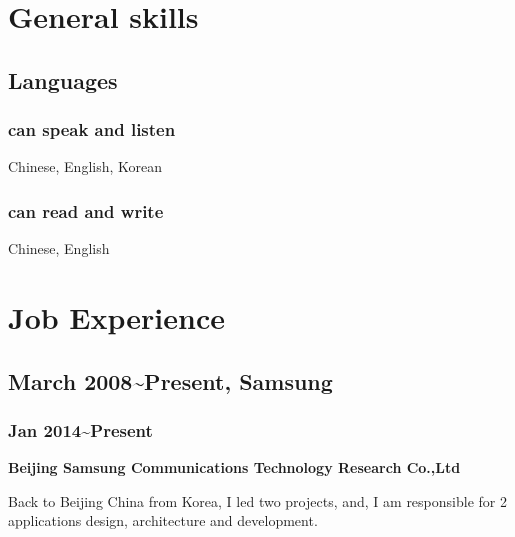 \documentclass{article}
\begin{document}
\section{General skills}
\subsection{Languages}

\subsubsection{can speak and listen}
Chinese, English, Korean

\subsubsection{can read and write}
Chinese, English

\section{Job Experience}
\subsection{March 2008\~{}Present, Samsung}

\subsubsection{Jan 2014\~{}Present}
\textbf{Beijing Samsung Communications Technology Research Co.,Ltd}

Back to Beijing China from Korea, I led two projects, and, I am responsible for 2 applications design, architecture and development.
\end{document}
